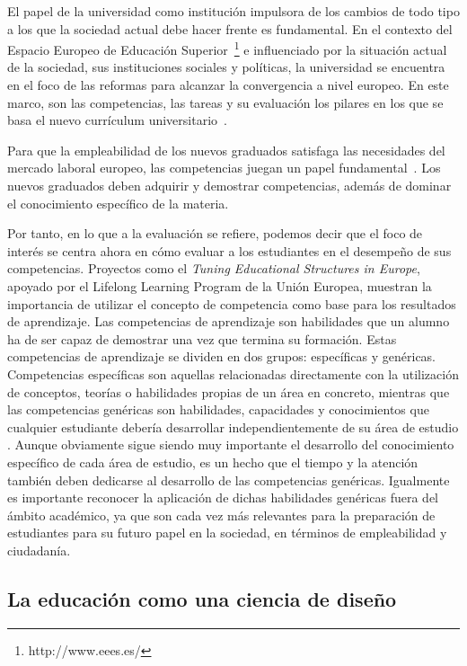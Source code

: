 El papel de la universidad como institución impulsora de los cambios de todo tipo a los que la sociedad actual debe hacer frente es fundamental. En el contexto del Espacio Europeo de Educación Superior~\footnote{http://www.eees.es/} e influenciado por la situación actual de  la sociedad, sus instituciones sociales y políticas, la universidad se encuentra en el foco de las reformas para alcanzar la convergencia a nivel europeo. En este marco, son las competencias, las tareas y su evaluación los pilares en los que se basa el nuevo currículum universitario~\cite{zabala2005espacio}.

Para que la empleabilidad de los nuevos graduados satisfaga las necesidades del mercado laboral europeo, las competencias juegan un papel fundamental~\cite{communique2012making}. Los nuevos graduados deben adquirir y demostrar competencias, además de dominar el conocimiento específico de la materia.

Por tanto, en lo que a la evaluación se refiere, podemos decir que el foco de interés se centra ahora en cómo evaluar a los estudiantes en el desempeño de sus competencias. Proyectos como el \emph{Tuning Educational Structures in Europe}, apoyado por el Lifelong Learning Program de la Unión Europea, muestran la importancia de utilizar el concepto de competencia como base para los resultados de aprendizaje. Las competencias de aprendizaje son habilidades que un alumno ha de ser capaz de demostrar una vez que termina su formación. Estas competencias de aprendizaje se dividen en dos grupos: específicas y genéricas. Competencias específicas son aquellas relacionadas directamente con la utilización de conceptos, teorías o habilidades propias de un área en concreto, mientras que las competencias genéricas son habilidades, capacidades y conocimientos que cualquier estudiante debería desarrollar independientemente de su área de estudio \cite{gonzalez2003tuning}. Aunque obviamente sigue siendo muy importante el desarrollo del conocimiento específico de cada área de estudio, es un hecho que el tiempo y la atención también deben dedicarse al desarrollo de las competencias genéricas. Igualmente es importante reconocer la aplicación de dichas habilidades genéricas fuera del ámbito académico, ya que son cada vez más relevantes para la preparación de estudiantes para su futuro papel en la sociedad, en términos de empleabilidad y ciudadanía.

\subsection*{La educación como una ciencia de diseño}

